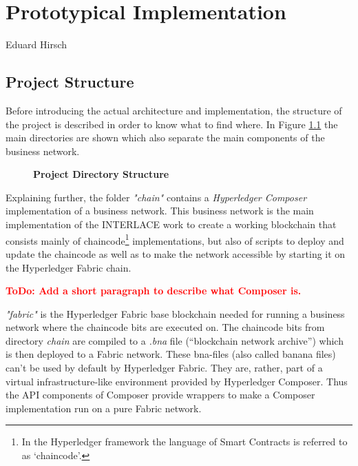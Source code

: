 \chapter{Prototypical Implementation}
\label{ch:prototype}

\vspace{-1cm}
\begin{center}
Eduard Hirsch
\end{center}

\section{Project Structure}
\label{sec:project-structure}

Before introducing the actual architecture and implementation, the structure of the project is described in order to know what to find where. In Figure \ref{fig:directory-structure} the main directories are shown which also separate the main components of the business network.

\begin{figure}[htbp]
\centering
\begin{minipage}{5cm}
\end{minipage}
\caption{\bf\small Project Directory Structure}
\label{fig:directory-structure}
\end{figure}

Explaining further, the folder \textit{"chain"} contains a \textit{Hyperledger Composer} implementation of a business network. This business network is the main implementation of the INTERLACE work to create a working blockchain that consists mainly of chaincode\footnote{In the Hyperledger framework the language of Smart Contracts is referred to as `chaincode'.} implementations, but also of scripts to deploy and update the chaincode as well as to make the network accessible by starting it on the Hyperledger Fabric chain.

\textcolor{red}{\bf ToDo: Add a short paragraph to describe what Composer is.}

\textit{"fabric"} is the Hyperledger Fabric base blockchain needed for running a business network where the chaincode bits are executed on. The chaincode bits from directory \textit{chain} are compiled to a \textit{.bna} file (``blockchain network archive'') which is then deployed to a Fabric network. These bna-files (also called banana files) can't be used by default by Hyperledger Fabric. They are, rather, part of a virtual infrastructure-like environment provided by Hyperledger Composer. Thus the API components of Composer provide wrappers to make a Composer implementation run on a pure Fabric network.

